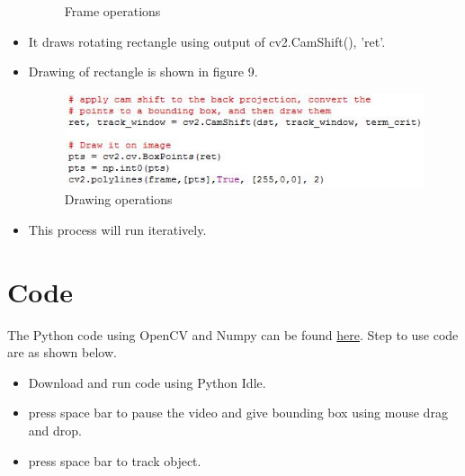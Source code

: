 \documentclass[11pt,a4paper]{article}
\begin{document}
\begin{itemize}
\begin{figure}
					\centering
					\caption{Frame operations}
				\end{figure}
				\newpage
				\item It draws rotating rectangle using output of cv2.CamShift(), 'ret'.
				\item Drawing of rectangle is shown in figure 9.
				\begin{figure}
					\includegraphics[scale=0.8 ]{../Images/drawing_code.JPG}
					\centering
					\caption{Drawing operations}
				\end{figure}
				\item This process will run iteratively.
			\end{itemize}
	\section{Code}
		The Python code using OpenCV and Numpy can be found \href{https://github.com/eYSIP-2016/Object-Tracking-Camera/tree/master/Tutorials/2.%20Tutorial%20on%20CAMShift%20Algorithm%20and%20How%20to%20use%20it%20using%20OpenCV%20and%20Python%20for%20Object%20Tracking/Code}{here}.
		Step to use code are as shown below.
		\begin{itemize}
			\item Download and run code using Python Idle.
			\item press space bar to pause the video and give bounding box using mouse drag and drop.
			\item press space bar to track object.
		\end{itemize}
	
\end{document}
